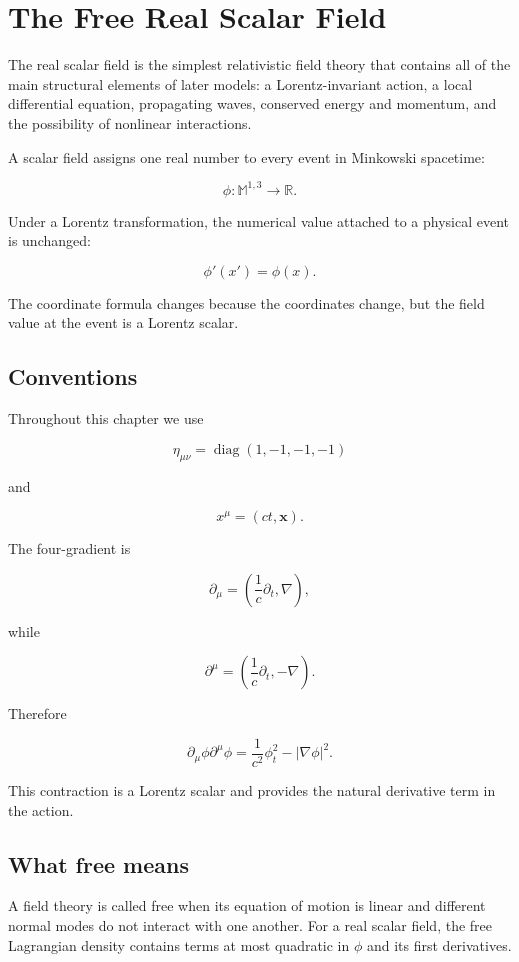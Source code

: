 \section{The Free Real Scalar Field}
\label{sec:free_real_scalar_field}

The real scalar field is the simplest relativistic field theory that contains all of the main structural elements of later models: a Lorentz-invariant action, a local differential equation, propagating waves, conserved energy and momentum, and the possibility of nonlinear interactions.

A scalar field assigns one real number to every event in Minkowski spacetime:

\[
\boxed{
\phi:\mathbb{M}^{1,3}\longrightarrow\mathbb{R}
}.
\]

Under a Lorentz transformation, the numerical value attached to a physical event is unchanged:

\[
\boxed{
\phi'(x')=\phi(x)
}.
\]

The coordinate formula changes because the coordinates change, but the field value at the event is a Lorentz scalar.

\subsection{Conventions}

Throughout this chapter we use

\[
\eta_{\mu\nu}
=
\operatorname{diag}(1,-1,-1,-1)
\]

and

\[
x^{\mu}=(ct,\mathbf{x}).
\]

The four-gradient is

\[
\partial_{\mu}
=
\left(
\frac{1}{c}\partial_{t},
\nabla
\right),
\]

while

\[
\partial^{\mu}
=
\left(
\frac{1}{c}\partial_{t},
-\nabla
\right).
\]

Therefore

\[
\boxed{
\partial_{\mu}\phi\partial^{\mu}\phi
=
\frac{1}{c^{2}}\phi_{t}^{2}
-
|\nabla\phi|^{2}
}.
\]

This contraction is a Lorentz scalar and provides the natural derivative term in the action.

\subsection{What free means}

A field theory is called free when its equation of motion is linear and different normal modes do not interact with one another. For a real scalar field, the free Lagrangian density contains terms at most quadratic in \(\phi\) and its first derivatives.

